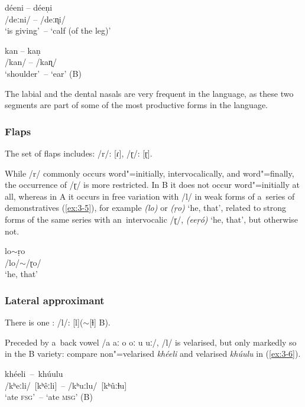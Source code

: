 \begin{exe}
\ex
\label{ex:3-3}
\gll déeni -- déeṇi \\
/deːni/ -- /deːɳi/ \\
\glt `is giving'~-- `calf (of the leg)' 

\ex
\label{ex:3-4}
\gll kan -- kaṇ \\
/kan/ -- /kaɳ/ \\
\glt `shoulder'~-- `ear' (B)
\end{exe}

The labial and the dental nasals are very frequent in the language, as these two segments are part of some of the most productive  forms in the language.

\subsubsection*{Flaps}

The set of flaps includes: /r/: [ɾ], /ɽ/: [ɽ].


While /r/ commonly occurs word"=initially, intervocalically, and word"=finally, the occurrence of /ɽ/
is more restricted. In B it does not occur word"=initially at all, whereas in A it occurs in free
variation with /l/ in weak forms of a~series of demonstratives (\ref{ex:3-5}), for example \textit{(lo)} or
\textit{(ṛo)} `he, that', related to strong forms of the same series with an~intervocalic
/ɽ/, \textit{(eeṛó)} `he, that', but otherwise not.

\begin{exe}
\ex
\label{ex:3-5}
\gll lo$\sim${}ṛo \\
/lo/$\sim${}/ɽo/ \\
\glt `he, that' 
\end{exe}

\subsubsection*{Lateral approximant}

There is one : /l/: [l]($\sim$[ɫ] B).


Preceded by a~back vowel /a aː o oː u uː/, /l/ is velarised, but only markedly so in the B variety: compare non"=velarised \textit{khéeli} and velarised \textit{khúulu} in (\ref{ex:3-6}).

\begin{exe}
\ex
\label{ex:3-6}
\gll khéeli~--~khúulu \\
/kʰeːli/~[kʰêːli]~-- /kʰuːlu/~[kʰûːɫu] \\ 
\glt `ate \textsc{fsg}'~-- `ate \textsc{msg}' (B)
\end{exe}

